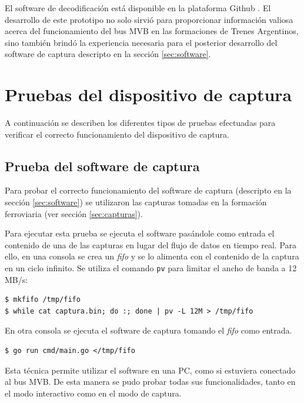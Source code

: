 El software de decodificación está disponible en la plataforma Github \cite{mvbparse-py}. El desarrollo de este prototipo no solo sirvió para proporcionar información valiosa acerca del funcionamiento del bus MVB en las formaciones de Trenes Argentinos, sino también brindó la experiencia necesaria para el posterior desarrollo del software de captura descripto en la sección \ref{sec:software}.

\section{Pruebas del dispositivo de captura}

A continuación se describen los diferentes tipos de pruebas efectuadas para verificar el correcto funcionamiento del dispositivo de captura.

\subsection{Prueba del software de captura}

Para probar el correcto funcionamiento del software de captura (descripto en la sección \ref{sec:software}) se utilizaron las capturas tomadas en la formación ferroviaria (ver sección \ref{sec:capturas}).

Para ejecutar esta prueba se ejecuta el software pasándole como entrada el contenido de una de las capturas en lugar del flujo de datos en tiempo real. Para ello, en una consola se crea un \textit{fifo} y se lo alimenta con el contenido de la captura en un ciclo infinito. Se utiliza el comando \texttt{pv} \cite{pv} para limitar el ancho de banda a 12 MB/s:

\begin{lstlisting}[basicstyle=\small,breaklines=true]
$ mkfifo /tmp/fifo
$ while cat captura.bin; do :; done | pv -L 12M > /tmp/fifo
\end{lstlisting}

En otra consola se ejecuta el software de captura tomando el \textit{fifo} como entrada.

\begin{lstlisting}[basicstyle=\small,breaklines=true]
$ go run cmd/main.go </tmp/fifo
\end{lstlisting}

Esta técnica permite utilizar el software en una PC, como si estuviera conectado al bus MVB.
De esta manera se pudo probar todas sus funcionalidades, tanto en el modo interactivo como en el modo de captura.

